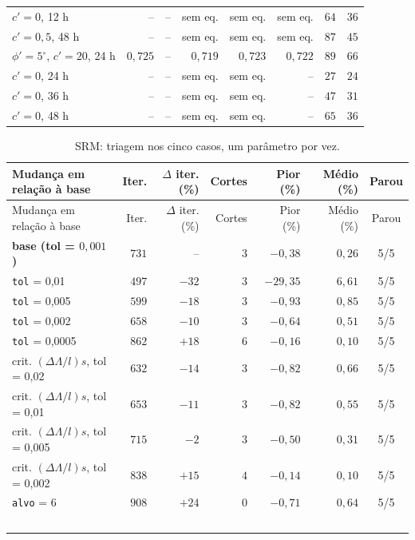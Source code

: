 \documentclass[11pt,a4paper]{article}
\numberwithin{equation}{section}
\begin{document}
{\begin{longtable}{lrrrrrrr}
$c' = 0$, 12 h & -- & -- & sem eq. & sem eq. & sem eq. & $64$ & $36$ \\
$c' = 0{,}5$, 48 h & -- & -- & sem eq. & sem eq. & sem eq. & $87$ & $45$ \\
$\phi' = 5^\circ$, $c' = 20$, 24 h & $0{,}725$ & -- & $0{,}719$ & $0{,}723$ & $0{,}722$ & $89$ & $66$ \\
$c' = 0$, 24 h & -- & -- & sem eq. & sem eq. & -- & $27$ & $24$ \\
$c' = 0$, 36 h & -- & -- & sem eq. & sem eq. & -- & $47$ & $31$ \\
$c' = 0$, 48 h & -- & -- & sem eq. & sem eq. & -- & $65$ & $36$ \\
\end{longtable}
}


{\footnotesize
\begin{longtable}{p{6.4cm}rrrrrc}
\caption{SRM: triagem nos cinco casos, um parâmetro por vez.}\label{tab:oat_srm}\\
\toprule
Mudança em relação à base & Iter. & $\Delta$ iter. (\%) & Cortes & Pior (\%) & Médio (\%) & Parou \\
\midrule
\endfirsthead
\toprule
Mudança em relação à base & Iter. & $\Delta$ iter. (\%) & Cortes & Pior (\%) & Médio (\%) & Parou \\
\midrule
\endhead
\bottomrule
\endfoot
\textbf{base (tol = $0{,}001$)} & $731$ & -- & $3$ & $-0{,}38$ & $0{,}26$ & 5/5 \\
\texttt{tol} = 0,01 & $497$ & $-32$ & $3$ & $-29{,}35$ & $6{,}61$ & 5/5 \\
\texttt{tol} = 0,005 & $599$ & $-18$ & $3$ & $-0{,}93$ & $0{,}85$ & 5/5 \\
\texttt{tol} = 0,002 & $658$ & $-10$ & $3$ & $-0{,}64$ & $0{,}51$ & 5/5 \\
\texttt{tol} = 0,0005 & $862$ & $+$$18$ & $6$ & $-0{,}16$ & $0{,}10$ & 5/5 \\
crit. $(\Delta\Lambda/l)s$, tol = 0,02 & $632$ & $-14$ & $3$ & $-0{,}82$ & $0{,}66$ & 5/5 \\
crit. $(\Delta\Lambda/l)s$, tol = 0,01 & $653$ & $-11$ & $3$ & $-0{,}82$ & $0{,}55$ & 5/5 \\
crit. $(\Delta\Lambda/l)s$, tol = 0,005 & $715$ & $-2$ & $3$ & $-0{,}50$ & $0{,}31$ & 5/5 \\
crit. $(\Delta\Lambda/l)s$, tol = 0,002 & $838$ & $+$$15$ & $4$ & $-0{,}14$ & $0{,}10$ & 5/5 \\
\texttt{alvo} = 6 & $908$ & $+$$24$ & $0$ & $-0{,}71$ & $0{,}64$ & 5/5 \\
$$
\end{longtable}}
\end{document}
